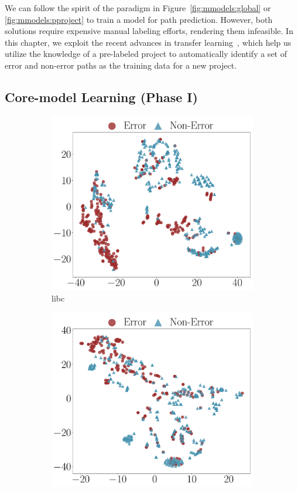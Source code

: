 \documentclass[12pt]{report}	%
\begin{document}
We can follow the spirit of the paradigm in Figure~\ref{fig:mmodels:global} or \ref{fig:mmodels:pproject}
to train a model for path prediction.
However, both solutions require expensive manual labeling efforts,
rendering them infeasible.
%
In this chapter, we exploit the recent advances in transfer learning~\cite{pan2010survey},
which help us utilize the knowledge of a pre-labeled project to 
automatically identify a set of error and non-error paths as the training data for a new project.


\subsection{Core-model Learning (Phase I)}
\label{sec:app:learning:phase1}

\begin{figure}
\centering
\begin{subfigure}[b]{0.5\textwidth}
	\centering
    \includegraphics[width=.85\linewidth]{images/glibc_uni_feats.pdf}
    \caption{libc}
     \label{fig:distri3:libc}
\end{subfigure}%
\hfill
\begin{subfigure}[b]{0.5\textwidth}
	\centering
    \includegraphics[width=.85\linewidth]{images/kernel_fs_uni_feats.pdf}

\end{subfigure}
\end{figure}
\end{document}
